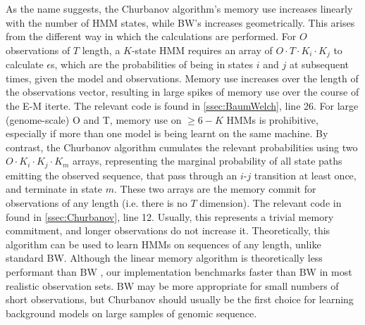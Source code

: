 As the name suggests, the Churbanov algorithm's memory use increases linearly with the number of HMM states, while BW's increases geometrically. This arises from the different way in which the calculations are performed. For $O$ observations of $T$ length, a $K$-state HMM requires an array of $O \cdot T \cdot K_i \cdot K_j$ to calculate $\epsilon$s, which are the probabilities of being in states $i$ and $j$ at subsequent times, given the model and observations. Memory use increases over the length of the observations vector, resulting in large spikes of memory use over the course of the E-M iterte. The relevant code is found in \autoref{ssec:BaumWelch}, line 26. For large (genome-scale) O and T, memory use on $\geq6-K$ HMMs is prohibitive, especially if more than one model is being learnt on the same machine. By contrast, the Churbanov algorithm cumulates the relevant probabilities using two $O \cdot K_i \cdot K_j \cdot K_m$ arrays, representing the marginal probability of all state paths emitting the observed sequence, that pass through an $i$-$j$ transition at least once, and terminate in state $m$. These two arrays are the memory commit for observations of any length (i.e. there is no $T$ dimension). The relevant code in found in \autoref{ssec:Churbanov}, line 12. Usually, this represents a trivial memory commitment, and longer observations do not increase it. Theoretically, this algorithm can be used to learn HMMs on sequences of any length, unlike standard BW. Although the linear memory algorithm is theoretically less performant than BW \cite{Churbanov2008}, our implementation benchmarks faster than BW in most realistic observation sets. BW may be more appropriate for small numbers of short observations, but Churbanov should usually be the first choice for learning background models on large samples of genomic sequence.